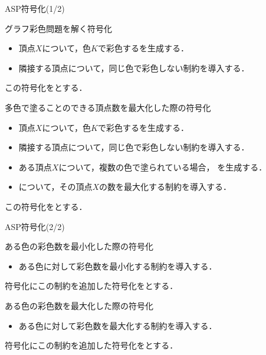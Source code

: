 \documentclass[dvipdfmx,11pt]{beamer}
\begin{document}

\begin{frame}{ASP符号化(1/2)}
 \begin{block}{グラフ彩色問題を解く符号化}
  \begin{itemize}
   \item 頂点$X$について，色$K$で彩色するを生成する．
   \item 隣接する頂点について，同じ色で彩色しない制約を導入する．
  \end{itemize}
  この符号化をとする．
 \end{block}
 \begin{block}{多色で塗ることのできる頂点数を最大化した際の符号化}
  \begin{itemize}
   \item 頂点$X$について，色$K$で彩色するを生成する．
   \item 隣接する頂点について，同じ色で彩色しない制約を導入する．
   \item ある頂点$X$について，複数の色で塗られている場合，
         を生成する．
   \item {}について，その頂点$X$の数を\alert{最大化}する制約を導入する．
  \end{itemize}
  この符号化をとする．
 \end{block}
\end{frame}


\begin{frame}{ASP符号化(2/2)}
 \begin{block}{ある色の彩色数を最小化した際の符号化}
  \begin{itemize}
   \item ある色に対して彩色数を\alert{最小化}する制約を導入する．
  \end{itemize}
   符号化にこの制約を追加した符号化をとする．
 \end{block}
 \begin{block}{ある色の彩色数を最大化した際の符号化}
  \begin{itemize}
   \item ある色に対して彩色数を\alert{最大化}する制約を導入する．
  \end{itemize}
   符号化にこの制約を追加した符号化をとする．
 \end{block}
\end{frame}
\end{document}
